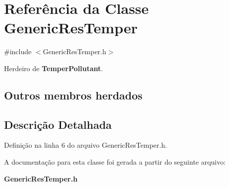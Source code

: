 \section{Referência da Classe Generic\+Res\+Temper}
\label{class_generic_res_temper}


{\ttfamily \#include $<$Generic\+Res\+Temper.\+h$>$}



Herdeiro de {\bf Temper\+Pollutant}.

\subsection*{Outros membros herdados}


\subsection{Descrição Detalhada}


Definição na linha 6 do arquivo Generic\+Res\+Temper.\+h.



A documentação para esta classe foi gerada a partir do seguinte arquivo\+:\begin{DoxyCompactItemize}
\item 
{\bf Generic\+Res\+Temper.\+h}\end{DoxyCompactItemize}
